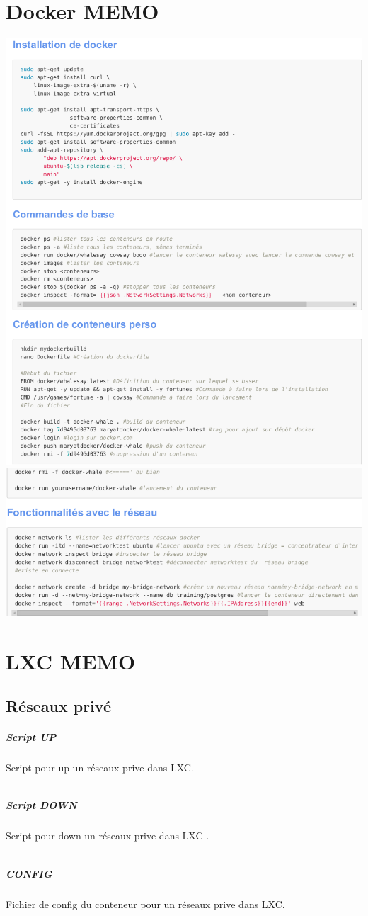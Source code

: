 \documentclass[french]{article}
\begin{document}
\section{Docker MEMO}
\includegraphics[scale=0.85]{docker1.png}
\newpage
\includegraphics[scale=0.85]{docker22.png}
\section{LXC MEMO}
\subsection{Réseaux privé}
\subparagraph{Script UP }
Script pour up un réseaux prive dans LXC. 
\inputminted{bash}{script/LXC/private-up.sh}
\subparagraph{Script DOWN }
Script pour down un réseaux prive dans LXC .
\inputminted{bash}{script/LXC/private-down.sh}
\subparagraph{CONFIG }
Fichier de config du conteneur pour un  réseaux prive dans LXC. 
\inputminted{bash}{script/LXC/LXC_RP_CONF}
\end{document}
